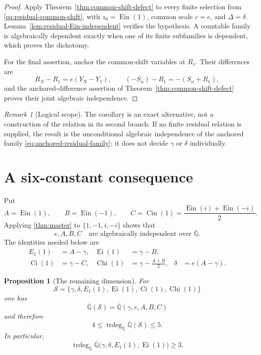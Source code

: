 \documentclass[11pt]{article}
\newtheorem{proposition}[theorem]{Proposition}
\theoremstyle{definition}
\theoremstyle{remark}
\newtheorem{remark}[theorem]{Remark}
\newcommand{\Qb}{\overline{\mathbb Q}}
\newcommand{\trdeg}{\operatorname{trdeg}}
\newcommand{\Ein}{\operatorname{Ein}}
\newcommand{\Cin}{\operatorname{Cin}}
\newcommand{\Ei}{\operatorname{Ei}}
\newcommand{\Ci}{\operatorname{Ci}}
\newcommand{\Chi}{\operatorname{Chi}}
\begin{document}
\begin{proof}
Apply Theorem~\ref{thm:common-shift-defect} to every finite selection from
\eqref{eq:residual-common-shift}, with
\(z_0=\Ein(1)\), common scale \(c=e\), and \(\Delta=\delta\).
Lemma~\ref{lem:residual-Ein-independent} verifies the hypothesis.  A
countable family is algebraically dependent exactly when one of its finite
subfamilies is dependent, which proves the dichotomy.

For the final assertion, anchor the common-shift variables at \(R_1\).  Their
differences are
\[
 R_N-R_1=e(Y_N-Y_1),
 \qquad
 (-S_n)-R_1=-(S_n+R_1),
\]
and the anchored-difference assertion of
Theorem~\ref{thm:common-shift-defect} proves their joint algebraic
independence.
\end{proof}

\begin{remark}[Logical scope]
The corollary is an exact alternative, not a construction of the relation in
its second branch.  If no finite residual relation is supplied, the result is
the unconditional algebraic independence of the anchored family
\eqref{eq:anchored-residual-family}; it does not decide \(\gamma\) or
\(\delta\) individually.
\end{remark}

\section{A six-constant consequence}

Put
\[
 A=\Ein(1),\qquad B=\Ein(-1),\qquad
 C=\Cin(1)=\frac{\Ein(i)+\Ein(-i)}2.
\]
Applying \cref{thm:master} to \(\{1,-1,i,-i\}\) shows that
\begin{equation}\label{eq:eabc-ind}
 e,A,B,C\quad\text{are algebraically independent over }\Qb.
\end{equation}
The identities needed below are
\begin{align}
 E_1(1)&=A-\gamma,&
 \Ei(1)&=\gamma-B,\label{eq:six-identities}\\
 \Ci(1)&=\gamma-C,&
 \Chi(1)&=\gamma-\frac{A+B}{2},&
 \delta&=e(A-\gamma).\nonumber
\end{align}

\begin{proposition}[The remaining dimension]\label{prop:one-dimension}
For
\[
 \mathcal S=\{\gamma,\delta,E_1(1),\Ei(1),\Ci(1),\Chi(1)\}
\]
one has
\[
 \Qb(\mathcal S)=\Qb(\gamma,e,A,B,C)
\]
and therefore
\[
 4\le \trdeg_{\Qb}\Qb(\mathcal S)\le5.
\]
In particular,
\[
 \trdeg_{\Qb}\Qb\bigl(\gamma,\delta,E_1(1),\Ei(1)\bigr)\ge3.
\]
\end{proposition}
\end{document}

